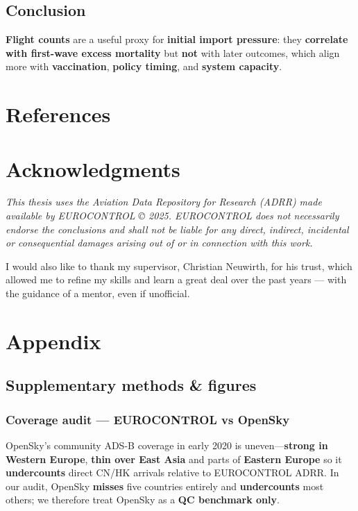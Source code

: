 \documentclass[
  authoryear,
  preprint,
  3p,
  onecolumn]{elsarticle}
\begin{document}
\subsection{Conclusion}\label{conclusion}

\textbf{Flight counts} are a useful proxy for \textbf{initial import
pressure}: they \textbf{correlate with first-wave excess mortality} but
\textbf{not} with later outcomes, which align more with
\textbf{vaccination}, \textbf{policy timing}, and \textbf{system
capacity}.

\section{References}\label{references}

\renewcommand{\bibsection}{}


\section{Acknowledgments}\label{acknowledgments}

\emph{This thesis uses the Aviation Data Repository for Research (ADRR)
made available by EUROCONTROL © 2025. EUROCONTROL does not necessarily
endorse the conclusions and shall not be liable for any direct,
indirect, incidental or consequential damages arising out of or in
connection with this work.}

I would also like to thank my supervisor, Christian Neuwirth, for his
trust, which allowed me to refine my skills and learn a great deal over
the past years --- with the guidance of a mentor, even if unofficial.

\section{Appendix}\label{appendix}

\subsection{Supplementary methods \& figures}\label{appendix-a}

\subsubsection{Coverage audit --- EUROCONTROL vs
OpenSky}\label{coverage-audit-eurocontrol-vs-opensky}

OpenSky's community ADS-B coverage in early 2020 is
uneven---\textbf{strong in Western Europe}, \textbf{thin over East Asia}
and parts of \textbf{Eastern Europe} so it \textbf{undercounts} direct
CN/HK arrivals relative to EUROCONTROL ADRR. In our audit, OpenSky
\textbf{misses} five countries entirely and \textbf{undercounts} most
others; we therefore treat OpenSky as a \textbf{QC benchmark only}.
\citep{strohmeier2021}
\end{document}
